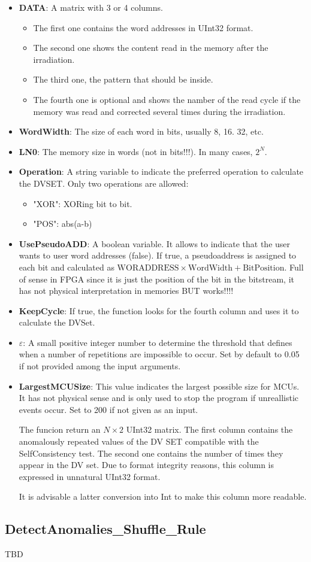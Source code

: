 \begin{itemize}
\begin{itemize}
		\item   \textbf{DATA}: A matrix with 3 or 4 columns. 
			 \begin{itemize}
			 	\item The first one contains the word addresses in UInt32 format.
			 	\item The second one shows the content read in the memory after the irradiation.
			 	\item The third one, the pattern that should be inside.
			 	\item  The fourth one is optional and shows the namber of the read cycle if the   memory was read and corrected several times during the irradiation.
			 \end{itemize}
		\item   \textbf{WordWidth}: The size of each word in bits, usually 8, 16. 32, etc.
		\item   \textbf{LN0}: The memory size in words (not in bits!!!). In many cases, \(2^N\).
		\item   \textbf{Operation}: A string variable to indicate the preferred operation to calculate
	    the DVSET. Only two operations are allowed: 
	    \begin{itemize}
	    	\item "XOR": XORing bit to bit.
	    	\item "POS": abs(a-b)
	    \end{itemize}
		\item  \textbf{UsePseudoADD}: A boolean variable. It allows to indicate that the user wants to user word addresses (false). If true, a pseudoaddress is assigned to each bit and calculated
	    as \(\text{WORADDRESS}\times\text{WordWidth} + \text{BitPosition}\). Full of sense in FPGA since it is just the position   of the bit in the bitstream, it has not physical interpretation in memories BUT works!!!!
		\item   \textbf{KeepCycle}: If true, the function looks for the fourth column and uses it to calculate the DVSet.
		\item   \textbf{\(\varepsilon\)}: A small positive integer number to determine the threshold that defines when a number of repetitions are impossible to occur. Set by default to 0.05 if not provided among the input arguments.
		\item  \textbf{LargestMCUSize}: This value indicates the largest possible size for MCUs. It has not physical sense  and is only used to stop the program if unreallistic events occur. Set to 200 if not given as an input.
	
	   The funcion return an \(N\times 2\) UInt32 matrix. The first column contains the anomalously repeated values of the DV SET compatible with the SelfConsistency test. The second one contains the number of times they appear in the DV set. Due to format integrity reasons, this column is expressed in unnatural UInt32 format. 
	  
	  It is advisable a latter conversion into Int to make this column more readable.
	\end{itemize}
\end{itemize}
\subsection*{DetectAnomalies\_Shuffle\_Rule}
 TBD
 